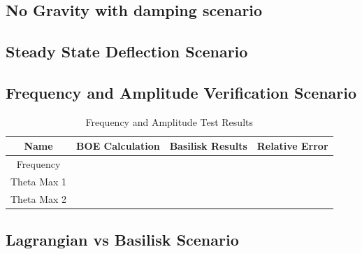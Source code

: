 \subsection{No Gravity with damping scenario}





\clearpage

\subsection{Steady State Deflection Scenario}


\clearpage

\subsection{Frequency and Amplitude Verification Scenario}
\begin{table}[htbp]
	\caption{Frequency and Amplitude Test Results}
	\label{tab:freqAmpResults}
	\centering \fontsize{10}{10}\selectfont
	\begin{tabular}{| c | c | c | c |} %
		\hline
		\textbf{Name}  & \textbf{BOE Calculation}  & \textbf{Basilisk Results} & \textbf{Relative Error} \\
		\hline
		Frequency  &  \\
		\hline
		Theta Max 1 &  \\
		\hline
		Theta Max 2 &  \\
		\hline
	\end{tabular}
\end{table}


\subsection{Lagrangian vs Basilisk Scenario}





\clearpage
